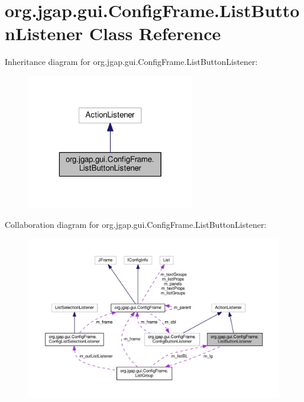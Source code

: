 \hypertarget{classorg_1_1jgap_1_1gui_1_1_config_frame_1_1_list_button_listener}{\section{org.\-jgap.\-gui.\-Config\-Frame.\-List\-Button\-Listener Class Reference}
\label{classorg_1_1jgap_1_1gui_1_1_config_frame_1_1_list_button_listener}
}


Inheritance diagram for org.\-jgap.\-gui.\-Config\-Frame.\-List\-Button\-Listener\-:
\nopagebreak
\begin{figure}[H]
\begin{center}
\leavevmode
\includegraphics[width=208pt]{classorg_1_1jgap_1_1gui_1_1_config_frame_1_1_list_button_listener__inherit__graph}
\end{center}
\end{figure}


Collaboration diagram for org.\-jgap.\-gui.\-Config\-Frame.\-List\-Button\-Listener\-:
\nopagebreak
\begin{figure}[H]
\begin{center}
\leavevmode
\includegraphics[width=350pt]{classorg_1_1jgap_1_1gui_1_1_config_frame_1_1_list_button_listener__coll__graph}
\end{center}
\end{figure}
